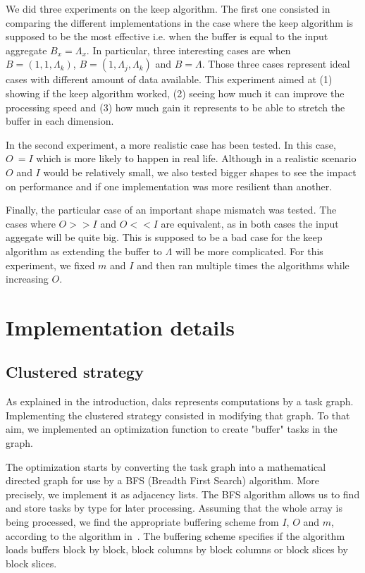 \documentclass[conference]{IEEEtran}
\begin{document}
We did three experiments on the keep algorithm. The first one consisted in
comparing the different implementations in the case where the keep algorithm is
supposed to be the most effective i.e. when the buffer is equal to the input
aggregate $B_x=\Lambda_x$. In particular, three interesting cases are when
$B=(1,1,\Lambda_k)$, $B=(1,\Lambda_j, \Lambda_k)$ and $B=\Lambda$. Those three
cases represent ideal cases with different amount of data available. This
experiment aimed at (1) showing if the keep algorithm worked, (2) seeing how much it
can improve the processing speed and (3) how much gain it represents to be able to
stretch the buffer in each dimension.

In the second experiment, a more realistic case has been tested. In this case,
$O~=I$ which is more likely to happen in real life. Although in a realistic
scenario $O$ and $I$ would be relatively small, we also tested bigger shapes to
see the impact on performance and if one implementation was more resilient than
another.

Finally, the particular case of an important shape mismatch was tested. The cases
where $O>>I$ and $O<<I$ are equivalent, as in both cases the input aggegate
will be quite big. This is supposed to be a bad case for the keep algorithm
as extending the buffer to $\Lambda$ will be more complicated. For this
experiment, we fixed $m$ and $I$ and then ran multiple times the algorithms
while increasing $O$.

\section{Implementation details}

\subsection{Clustered strategy}

As explained in the introduction, daks represents computations by a task graph.
Implementing the clustered strategy consisted in modifying that graph. To that
aim, we implemented an optimization function to create "buffer" tasks in the
graph.

The optimization starts by converting the task graph into a mathematical
directed graph for use by a BFS (Breadth First Search) algorithm. More
precisely, we implement it as adjacency lists. The BFS algorithm allows us to
find and store tasks by type for later processing. Assuming that the whole array
is being processed, we find the appropriate buffering scheme from $I$, $O$ and
$m$, according to the algorithm in~\cite{seqalgorithms}. The buffering scheme
specifies if the algorithm loads buffers block by block, block columns by
block columns or block slices by block slices.
\end{document}
